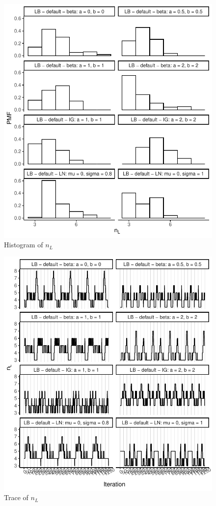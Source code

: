\documentclass{amsart}
\begin{document}
\begin{figure}[ht]
	\centering
	\includegraphics[width=0.95\linewidth]{hist_nl_3.pdf}
	\caption{Histogram of $n_L$}
	\label{fig:hist:nl:3}
\end{figure}

\begin{figure}[ht]
	\centering
	\includegraphics[width=0.95\linewidth]{trace_nl_3.pdf}
	\caption{Trace of $n_L$}
	\label{fig:trace:nl:3}
\end{figure}
\end{document}
